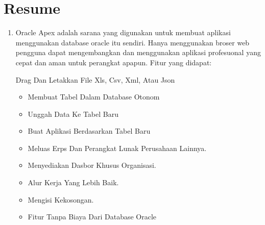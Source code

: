 \chapter*{Resume}

\begin{enumerate}
	\item Oracle Apex adalah sarana yang digunakan untuk membuat aplikasi menggunakan database oracle itu 	sendiri. Hanya menggunakan broser web pengguna  dapat mengembangkan dan menggunakan aplikasi 				profesuonal yang cepat dan aman untuk perangkat apapun. Fitur yang didapat:
	\begin{itemize}
	Drag Dan Letakkan File Xls, Csv, Xml, Atau Json
	\end{itemize}
	
	\begin{itemize}
	\item
	 Membuat Tabel Dalam Database Otonom
	\end{itemize}
	
	\begin{itemize}
	\item Unggah Data Ke Tabel Baru
	\end{itemize}
	
	\begin{itemize}
	\item Buat Aplikasi Berdasarkan Tabel Baru
	\end{itemize}
	
	\begin{itemize}  
	\item Meluas Erps Dan Perangkat Lunak Perusahaan Lainnya.
	\end{itemize}

	\begin{itemize}
	\item Menyediakan Dasbor Khusus Organisasi.
	\end{itemize}
	
	\begin{itemize}
	\item Alur Kerja Yang Lebih Baik.
	\end{itemize}

	\begin{itemize}
	\item Mengisi Kekosongan.
	\end{itemize}
		
	\begin{itemize}
	\item Fitur Tanpa Biaya Dari Database Oracle
	\end{itemize}
	

\end{enumerate}

